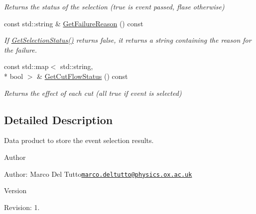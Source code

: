 \begin{DoxyCompactItemize}
\begin{DoxyCompactList}\small\item\em Returns the status of the selection (true is event passed, flase otherwise) \end{DoxyCompactList}\item 
\hypertarget{classubana_1_1SelectionResult_abfd85000aca03d3cd347cde67f7b7e4b}{const std\-::string \& \hyperlink{classubana_1_1SelectionResult_abfd85000aca03d3cd347cde67f7b7e4b}{Get\-Failure\-Reason} () const }\label{classubana_1_1SelectionResult_abfd85000aca03d3cd347cde67f7b7e4b}

\begin{DoxyCompactList}\small\item\em If \hyperlink{classubana_1_1SelectionResult_a776daea1e79f4b6978f0d4fd17a0a845}{Get\-Selection\-Status()} returns false, it returns a string containing the reason for the failure. \end{DoxyCompactList}\item 
\hypertarget{classubana_1_1SelectionResult_a96cd70fc1bd429e073961bfe0c01d1b2}{const std\-::map$<$ std\-::string, \\*
bool $>$ \& \hyperlink{classubana_1_1SelectionResult_a96cd70fc1bd429e073961bfe0c01d1b2}{Get\-Cut\-Flow\-Status} () const }\label{classubana_1_1SelectionResult_a96cd70fc1bd429e073961bfe0c01d1b2}

\begin{DoxyCompactList}\small\item\em Returns the effect of each cut (all true if event is selected) \end{DoxyCompactList}\end{DoxyCompactItemize}


\subsection{Detailed Description}
Data product to store the event selection results. 

\begin{DoxyAuthor}{Author}

\end{DoxyAuthor}
\begin{DoxyParagraph}{Author\-:}
Marco Del Tutto\href{mailto:marco.deltutto@physics.ox.ac.uk}{\tt marco.\-deltutto@physics.\-ox.\-ac.\-uk} 
\end{DoxyParagraph}


\begin{DoxyVersion}{Version}

\end{DoxyVersion}
\begin{DoxyParagraph}{Revision\-:}
1. 
\end{DoxyParagraph}


